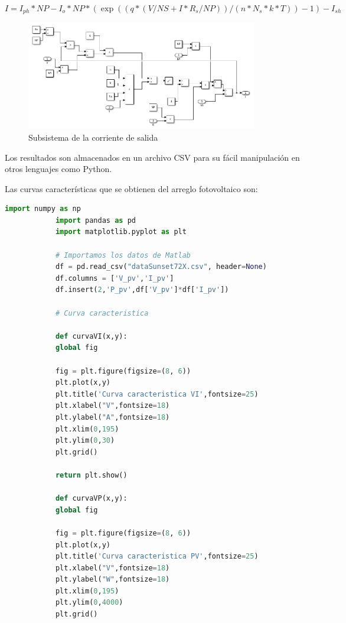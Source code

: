 \documentclass[a4paper,12pt]{article}
\begin{document}
\begin{itemize}
			\begin{equation*}
				I = I_{ph}*NP - I_o * NP *(\exp((q*(V/NS + I*R_s/NP))/(n*N_s*k*T))-1)-I_{sh}
			\end{equation*}
			
			\begin{figure}[htb]
				\centering
				\includegraphics[width=0.9\textwidth]{./imagenes/simulink7.png}
				\caption{Subsistema de la corriente de salida}
			\end{figure} 
		
		Los resultados son almacenados en un archivo CSV para su fácil manipulación en otros lenguajes como Python.
		
		Las curvas características que se obtienen del arreglo fotovoltaico son:
		
		\begin{lstlisting}[language=Python, caption=Python example]
			import numpy as np
			import pandas as pd
			import matplotlib.pyplot as plt
			
			# Importamos los datos de Matlab
			df = pd.read_csv("dataSunset72X.csv", header=None)
			df.columns = ['V_pv','I_pv']
			df.insert(2,'P_pv',df['V_pv']*df['I_pv'])
			
			# Curva caracteristica
			
			def curvaVI(x,y):
			global fig
			
			fig = plt.figure(figsize=(8, 6))
			plt.plot(x,y)
			plt.title('Curva caracteristica VI',fontsize=25)
			plt.xlabel("V",fontsize=18)
			plt.ylabel("A",fontsize=18)
			plt.xlim(0,195)
			plt.ylim(0,30)
			plt.grid()
			
			return plt.show()
			
			def curvaVP(x,y):
			global fig
			
			fig = plt.figure(figsize=(8, 6))
			plt.plot(x,y)
			plt.title('Curva caracteristica PV',fontsize=25)
			plt.xlabel("V",fontsize=18)
			plt.ylabel("W",fontsize=18)
			plt.xlim(0,195)
			plt.ylim(0,4000)
			plt.grid()
			

\end{lstlisting}
\end{itemize}
\end{document}
